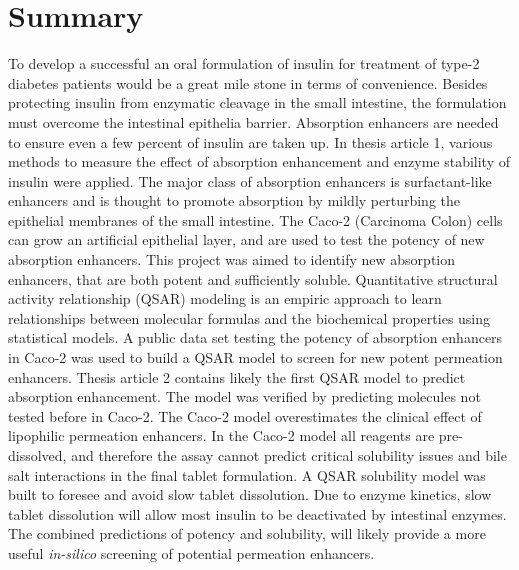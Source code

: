 \chapter{Summary}
To develop a successful an oral formulation of insulin for treatment of type-2 diabetes patients would be a great mile stone in terms of convenience. Besides protecting insulin from enzymatic cleavage in the small intestine, the formulation must overcome the intestinal epithelia barrier. Absorption enhancers are needed to ensure even a few percent of insulin are taken up. In thesis article 1, various methods to measure the effect of absorption enhancement and enzyme stability of insulin were applied. The major class of absorption enhancers is surfactant-like enhancers and is thought to promote absorption by mildly perturbing the epithelial membranes of the small intestine. The Caco-2 (Carcinoma Colon) cells can grow an artificial epithelial layer, and are used to test the potency of new absorption enhancers. This project was aimed to identify new absorption enhancers, that are both potent and sufficiently soluble. Quantitative structural activity relationship (QSAR) modeling is an empiric approach to learn relationships between molecular formulas and the biochemical properties using statistical models. A public data set testing the potency of absorption enhancers in Caco-2 was used to build a QSAR model to screen for new potent permeation enhancers. Thesis article 2 contains likely the first QSAR model to predict absorption enhancement. The model was verified by predicting molecules not tested before in Caco-2. The Caco-2 model overestimates the clinical effect of lipophilic permeation enhancers.
In the Caco-2 model all reagents are pre-dissolved, and therefore the assay cannot predict critical solubility issues and bile salt interactions in the final tablet formulation. A QSAR solubility model was built to foresee and avoid slow tablet dissolution. Due to enzyme kinetics, slow tablet dissolution will allow most insulin to be deactivated by intestinal enzymes. The combined predictions of potency and solubility, will likely provide a more useful \textit{in-silico} screening of potential permeation enhancers.


